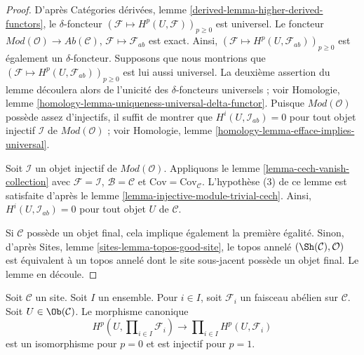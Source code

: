 \begin{proof}
D'après Catégories dérivées,
lemme \ref{derived-lemma-higher-derived-functors}, le $\delta$-foncteur
$(\mathcal{F} \mapsto H^p(U, \mathcal{F}))_{p \geq 0}$ est universel. Le
foncteur
$\textit{Mod}(\mathcal{O}) \to \textit{Ab}(\mathcal{C})$,
$\mathcal{F} \mapsto \mathcal{F}_{ab}$ est exact. Ainsi,
$(\mathcal{F} \mapsto H^p(U, \mathcal{F}_{ab}))_{p \geq 0}$
est également un $\delta$-foncteur. Supposons que nous montrions que
$(\mathcal{F} \mapsto H^p(U, \mathcal{F}_{ab}))_{p \geq 0}$
est lui aussi universel. La deuxième assertion du lemme découlera alors de
l'unicité des $\delta$-foncteurs universels ; voir Homologie,
lemme \ref{homology-lemma-uniqueness-universal-delta-functor}.
Puisque $\textit{Mod}(\mathcal{O})$ possède assez d'injectifs, il suffit de
montrer que $H^i(U, \mathcal{I}_{ab}) = 0$ pour tout objet injectif
$\mathcal{I}$ de $\textit{Mod}(\mathcal{O})$ ; voir Homologie,
lemme \ref{homology-lemma-efface-implies-universal}.

\medskip\noindent
Soit $\mathcal{I}$ un objet injectif de $\textit{Mod}(\mathcal{O})$.
Appliquons le lemme \ref{lemma-cech-vanish-collection} avec
$\mathcal{F} = \mathcal{I}$, $\mathcal{B} = \mathcal{C}$ et
$\text{Cov} = \text{Cov}_\mathcal{C}$.
L'hypothèse (3) de ce lemme est satisfaite d'après le
lemme \ref{lemma-injective-module-trivial-cech}.
Ainsi, $H^i(U, \mathcal{I}_{ab}) = 0$ pour tout objet $U$ de $\mathcal{C}$.

\medskip\noindent
Si $\mathcal{C}$ possède un objet final, cela implique également la première
égalité. Sinon, d'après Sites, lemme \ref{sites-lemma-topos-good-site}, le
topos annelé $(\Sh(\mathcal{C}), \mathcal{O})$ est équivalent à un topos annelé
dont le site sous-jacent possède un objet final. Le lemme en découle.
\end{proof}

\begin{lemma}
\label{lemma-cohomology-products}
Soit $\mathcal{C}$ un site. Soit $I$ un ensemble. Pour $i \in I$, soit
$\mathcal{F}_i$ un faisceau abélien sur $\mathcal{C}$. Soit
$U \in \Ob(\mathcal{C})$. Le morphisme canonique
$$
H^p(U, \prod\nolimits_{i \in I} \mathcal{F}_i)
\longrightarrow
\prod\nolimits_{i \in I} H^p(U, \mathcal{F}_i)
$$
est un isomorphisme pour $p = 0$ et est injectif pour $p = 1$.
\end{lemma}

